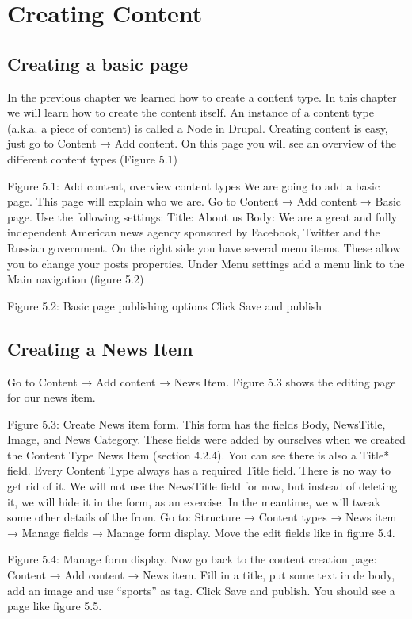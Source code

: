 \chapter{Creating Content}
\label{ch:creating_content}

\section{Creating a basic page}
In the previous chapter we learned how to create a content type. In this chapter we will learn how to create the content itself. An instance of a content type (a.k.a. a piece of content) is called a Node in Drupal. Creating content is easy, just go to Content → Add content. On this page you will see an overview of the different content types (Figure 5.1)

Figure 5.1: Add content, overview content types
We are going to add a basic page. This page will explain who we are. Go to Content → Add content → Basic page. Use the following settings:
Title: About us
Body: We are a great and fully independent American news agency sponsored by Facebook, Twitter and the Russian government.
On the right side you have several menu items. These allow you to change your posts properties. Under Menu settings add a menu link to the Main navigation (figure 5.2)

Figure 5.2: Basic page publishing options
Click Save and publish

\section{Creating a News Item}
Go to Content → Add content → News Item. Figure 5.3 shows the editing page for our news item. 

Figure 5.3: Create News item form.
This form has the fields Body, NewsTitle, Image, and News Category. These fields were added by ourselves when we created the Content Type News Item (section 4.2.4). You can see there is also a Title* field. Every Content Type always has a required Title field. There is no way to get rid of it. We will not use the NewsTitle field for now, but instead of deleting it, we will hide it in the form, as an exercise. In the meantime, we will tweak some other details of the from.
Go to: Structure → Content types → News item → Manage fields → Manage form display. Move the edit fields like in figure 5.4.

Figure 5.4: Manage form display.
Now go back to the content creation page: Content → Add content → News item. 
Fill in a title, put some text in de body, add an image and use “sports” as tag.
Click Save and publish. You should see a page like figure 5.5.

